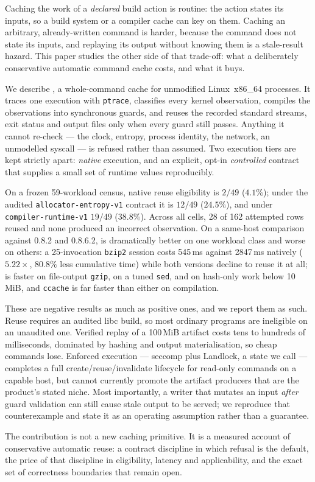 Caching the work of a \emph{declared} build action is routine: the action states its inputs, so a
build system or a compiler cache can key on them. Caching an arbitrary, already-written command is
harder, because the command does not state its inputs, and replaying its output without knowing
them is a stale-result hazard. This paper studies the other side of that trade-off: what a
deliberately conservative automatic command cache costs, and what it buys.

We describe \tracejit{}, a whole-command cache for unmodified Linux~x86\_64 processes. It traces
one execution with \texttt{ptrace}, classifies every kernel observation, compiles the observations
into synchronous guards, and reuses the recorded standard streams, exit status and output files
only when every guard still passes. Anything it cannot re-check --- the clock, entropy, process
identity, the network, an unmodelled syscall --- is refused rather than assumed. Two execution
tiers are kept strictly apart: \emph{native} execution, and an explicit, opt-in \emph{controlled}
contract that supplies a small set of runtime values reproducibly.

On a frozen 59-workload census, native reuse eligibility is $2/49$ ($4.1\%$); under the audited
\texttt{allocator-entropy-v1} contract it is $12/49$ ($24.5\%$), and under
\texttt{compiler-runtime-v1} $19/49$ ($38.8\%$). Across all cells, 28 of 162 attempted rows reused
and none produced an incorrect observation. On a same-host comparison against \firebuild{}
0.8.2 and 0.8.6.2, \tracejit{} is dramatically better on one workload class and worse on others:
a 25-invocation \texttt{bzip2} session costs 545\,ms against 2847\,ms natively ($5.22\times$,
$80.8\%$ less cumulative time) while both \firebuild{} versions decline to reuse it at all;
\firebuild{} is faster on file-output \texttt{gzip}, on a tuned \texttt{sed}, and on hash-only work
below 10\,MiB, and \texttt{ccache} is far faster than either on compilation.

These are negative results as much as positive ones, and we report them as such. Reuse requires an
audited libc build, so most ordinary programs are ineligible on an unaudited one. Verified replay
of a 100\,MiB artifact costs tens to hundreds of milliseconds, dominated by hashing and output
materialisation, so cheap commands lose. Enforced execution --- seccomp plus Landlock, a state we
call \proven{} --- completes a full create/reuse/invalidate lifecycle for read-only commands on a
capable host, but cannot currently promote the artifact producers that are the product's stated
niche. Most importantly, a writer that mutates an input \emph{after} guard validation can still
cause stale output to be served; we reproduce that counterexample and state it as an operating
assumption rather than a guarantee.

The contribution is not a new caching primitive. It is a measured account of conservative
automatic reuse: a contract discipline in which refusal is the default, the price of that
discipline in eligibility, latency and applicability, and the exact set of correctness boundaries
that remain open.
